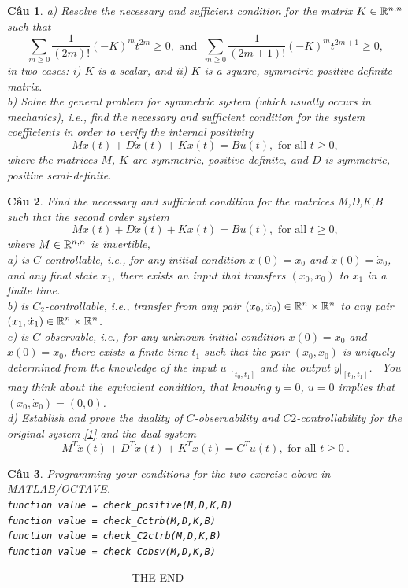 \documentclass[11pt]{article}
\newtheorem{bt}{Câu}
\begin{document}
\begin{bt}
a) Resolve the necessary and sufficient condition for the matrix $K\in \mathbb{R}^{n,n}$ such that
\begin{equation*}
\sum_{m\geq 0}\dfrac{1}{(2m)!} (-K)^m t^{2m} \geq 0, \mbox{ and }
\ 
\sum_{m\geq 0}\dfrac{1}{(2m+1)!} (-K)^m t^{2m+1} \geq 0,
\end{equation*}
%
in two cases: i) $K$ is a scalar, and ii) $K$ is a square, symmetric positive definite matrix. \\
b) Solve the general problem for symmetric system (which usually occurs in mechanics), i.e., find the necessary and sufficient condition for the system coefficients in order to verify the internal positivity
%
\[
M \ddot{x}(t) + D \dot{x}(t) + K x(t) = B u(t), \mbox{ for all } t\geq 0,
\]
where the matrices $M$, $K$ are symmetric, positive definite, and $D$ is symmetric, positive semi-definite.
%
\end{bt}

\begin{bt}
Find the necessary and sufficient condition for the matrices M,D,K,B such that the second order system
%
\begin{equation}\label{1}
M \ddot{x}(t) + D \dot{x}(t) + K x(t) = B u(t), \mbox{ for all } t\geq 0,
\end{equation}
%
where $M \in \mathbb{R}^{n,n}$ is invertible, \\
%
a) is $C$-controllable, i.e., for any initial condition $x(0) = x_0$ and $\dot{x}(0) = \dot{x}_0$, and any final state $x_1$, there exists an input that transfers $(x_0,\dot{x}_0)$ to $x_1$ in a finite time. \\
b) is $C_2$-controllable, i.e., transfer from any pair $(x_0,\dot{x}_0) \in \mathbb{R}^{n} \times \mathbb{R}^n$ to any pair $(x_1,\dot{x}_1) \in \mathbb{R}^{n} \times \mathbb{R}^n$. \\
c) is $C$-observable, i.e., for any unknown initial condition $x(0) = x_0$ and $\dot{x}(0) = \dot{x}_0$, there exists a finite time $t_1$ such that 
the pair $(x_0,\dot{x}_0)$ is uniquely determined from the knowledge of 
the input $u|_{[t_0,t_1]}$ and the output $y|_{[t_0,t_1]}$. \
You may think about the equivalent condition, that knowing $y=0$, $u=0$ implies that $(x_0,\dot{x}_0)=(0,0)$.\\
d) Establish and prove the duality of $C$-observability and $C2$-controllability for the original system \eqref{1} and the dual system
%
\begin{equation}\label{2}
M^T \ddot{x}(t) + D^T \dot{x}(t) + K^T x(t) = C^T u(t), \mbox{ for all } t\geq 0 \ .
\end{equation}
%
%
\end{bt}

\begin{bt}
Programming your conditions for the two exercise above in MATLAB/OCTAVE.\\
\verb|function value = check_positive(M,D,K,B)| \\
\verb|function value = check_Cctrb(M,D,K,B)| \\
\verb|function value = check_C2ctrb(M,D,K,B)| \\
\verb|function value = check_Cobsv(M,D,K,B)|
\end{bt}

\vskip 1cm
\centerline{———————————  THE END ——————————-}
\end{document}
